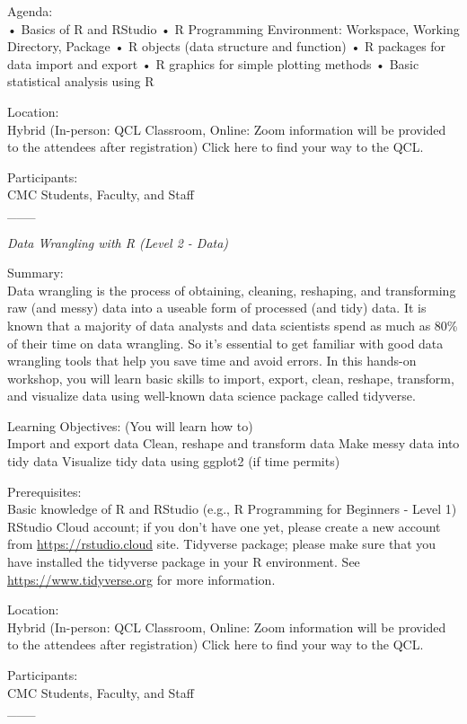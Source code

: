 \documentclass[
]{book}
\begin{document}
Agenda:\\
• Basics of R and RStudio
• R Programming Environment: Workspace, Working Directory, Package
• R objects (data structure and function)
• R packages for data import and export
• R graphics for simple plotting methods
• Basic statistical analysis using R

Location:\\
Hybrid (In-person: QCL Classroom, Online: Zoom information will be provided to the attendees after registration)
Click here to find your way to the QCL.

Participants:\\
CMC Students, Faculty, and Staff\\
\_\_\_

\emph{Data Wrangling with R (Level 2 - Data)}

Summary:\\
Data wrangling is the process of obtaining, cleaning, reshaping, and transforming raw (and messy) data into a useable form of processed (and tidy) data. It is known that a majority of data analysts and data scientists spend as much as 80\% of their time on data wrangling. So it's essential to get familiar with good data wrangling tools that help you save time and avoid errors. In this hands-on workshop, you will learn basic skills to import, export, clean, reshape, transform, and visualize data using well-known data science package called tidyverse.

Learning Objectives: (You will learn how to)\\
Import and export data
Clean, reshape and transform data
Make messy data into tidy data
Visualize tidy data using ggplot2 (if time permits)

Prerequisites:\\
Basic knowledge of R and RStudio (e.g., R Programming for Beginners - Level 1)
RStudio Cloud account; if you don't have one yet, please create a new account from \url{https://rstudio.cloud} site.
Tidyverse package; please make sure that you have installed the tidyverse package in your R environment. See \url{https://www.tidyverse.org} for more information.

Location:\\
Hybrid (In-person: QCL Classroom, Online: Zoom information will be provided to the attendees after registration)
Click here to find your way to the QCL.

Participants:\\
CMC Students, Faculty, and Staff\\
\_\_\_
\end{document}
